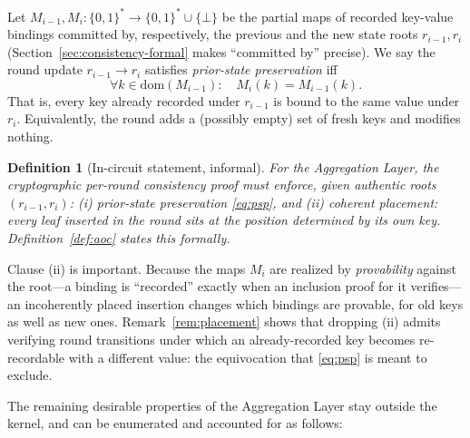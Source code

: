 \documentclass[twocolumn]{article}
\newtheorem{definition}{Definition}
\begin{document}
Let $M_{i-1}, M_i \colon \{0,1\}^* \to \{0,1\}^* \cup \{\bot\}$ be the partial maps of recorded key-value bindings committed by, respectively, the previous and the new state roots $r_{i-1}, r_i$ (Section~\ref{sec:consistency-formal} makes ``committed by'' precise). We say the round update $r_{i-1} \to r_i$ satisfies \emph{prior-state preservation} iff
\begin{equation}
  \forall k \in \mathrm{dom}(M_{i-1})\colon\quad M_i(k) = M_{i-1}(k).
  \label{eq:psp}
\end{equation}
That is, every key already recorded under $r_{i-1}$ is bound to the same value under $r_i$. Equivalently, the round adds a (possibly empty) set of fresh keys and modifies nothing.

\begin{definition}[In-circuit statement, informal]
\label{def:minimal}
For the Aggregation Layer, the cryptographic per-round consistency proof must enforce, given authentic roots $(r_{i-1}, r_i)$: (i) prior-state preservation \eqref{eq:psp}, and (ii) \emph{coherent placement}: every leaf inserted in the round sits at the position determined by its own key. Definition~\ref{def:aoc} states this formally.
\end{definition}

Clause (ii) is important. Because the maps $M_i$ are realized by \emph{provability} against the root---a binding is ``recorded'' exactly when an inclusion proof for it verifies---an incoherently placed insertion changes which bindings are provable, for old keys as well as new ones. Remark~\ref{rem:placement} shows that dropping (ii) admits verifying round transitions under which an already-recorded key becomes re-recordable with a different value: the equivocation that \eqref{eq:psp} is meant to exclude.

The remaining desirable properties of the Aggregation Layer stay outside the kernel, and can be enumerated and accounted for as follows:
\end{document}
